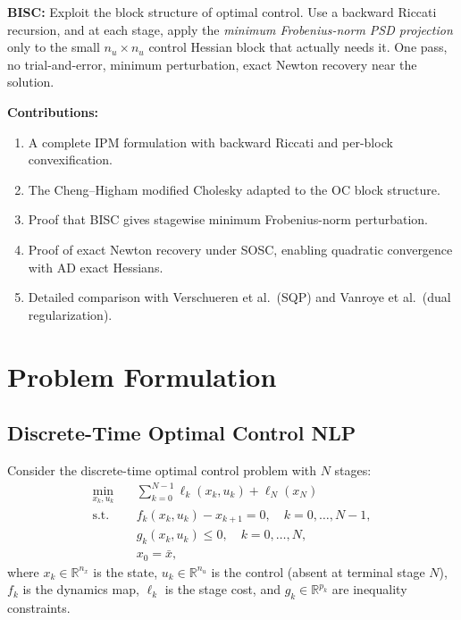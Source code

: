 \documentclass[11pt]{article}
\begin{document}
\textbf{BISC:} Exploit the block structure of optimal control. Use a backward
Riccati recursion, and at each stage, apply the \emph{minimum Frobenius-norm
PSD projection} only to the small $n_u \times n_u$ control Hessian block that
actually needs it. One pass, no trial-and-error, minimum perturbation, exact
Newton recovery near the solution.

\textbf{Contributions:}
\begin{enumerate}
  \item A complete IPM formulation with backward Riccati and per-block convexification.
  \item The Cheng--Higham modified Cholesky adapted to the OC block structure.
  \item Proof that BISC gives stagewise minimum Frobenius-norm perturbation.
  \item Proof of exact Newton recovery under SOSC, enabling quadratic convergence
        with AD exact Hessians.
  \item Detailed comparison with Verschueren et al.\ (SQP) and Vanroye et al.\ (dual regularization).
\end{enumerate}


\section{Problem Formulation}

\subsection{Discrete-Time Optimal Control NLP}

Consider the discrete-time optimal control problem with $N$ stages:
\begin{equation}\label{eq:ocp}
\begin{aligned}
  \min_{x_k, u_k} \quad & \sum_{k=0}^{N-1} \ell_k(x_k, u_k) + \ell_N(x_N) \\
  \text{s.t.} \quad
    & f_k(x_k, u_k) - x_{k+1} = 0, \quad k = 0, \dots, N-1, \\
    & g_k(x_k, u_k) \le 0, \quad k = 0, \dots, N, \\
    & x_0 = \bar{x},
\end{aligned}
\end{equation}
where $x_k \in \mathbb{R}^{n_x}$ is the state, $u_k \in \mathbb{R}^{n_u}$ is
the control (absent at terminal stage $N$), $f_k$ is the dynamics map, $\ell_k$
is the stage cost, and $g_k \in \mathbb{R}^{p_k}$ are inequality constraints.
\end{document}

